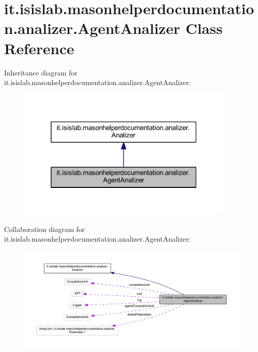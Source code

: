 \hypertarget{classit_1_1isislab_1_1masonhelperdocumentation_1_1analizer_1_1_agent_analizer}{\section{it.\-isislab.\-masonhelperdocumentation.\-analizer.\-Agent\-Analizer Class Reference}
\label{classit_1_1isislab_1_1masonhelperdocumentation_1_1analizer_1_1_agent_analizer}
}


Inheritance diagram for it.\-isislab.\-masonhelperdocumentation.\-analizer.\-Agent\-Analizer\-:
\nopagebreak
\begin{figure}[H]
\begin{center}
\leavevmode
\includegraphics[width=295pt]{classit_1_1isislab_1_1masonhelperdocumentation_1_1analizer_1_1_agent_analizer__inherit__graph}
\end{center}
\end{figure}


Collaboration diagram for it.\-isislab.\-masonhelperdocumentation.\-analizer.\-Agent\-Analizer\-:
\nopagebreak
\begin{figure}[H]
\begin{center}
\leavevmode
\includegraphics[width=350pt]{classit_1_1isislab_1_1masonhelperdocumentation_1_1analizer_1_1_agent_analizer__coll__graph}
\end{center}
\end{figure}
